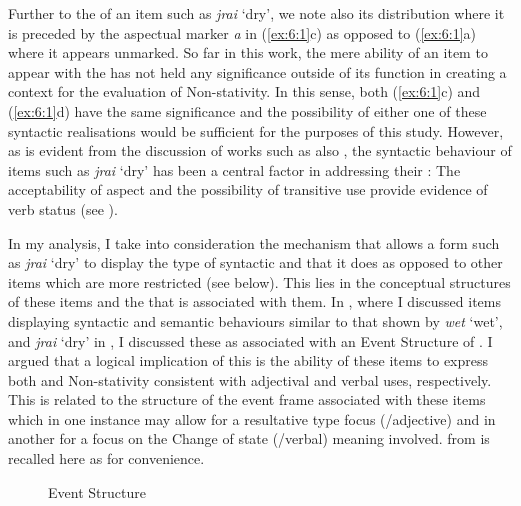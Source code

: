 Further to the  of an item such as \textit{jrai} `dry', we note also its distribution where it is preceded by the aspectual marker \textit{a} in (\ref{ex:6:1}c) as opposed to (\ref{ex:6:1}a) where it appears unmarked. So far in this work, the mere ability of an item to appear with the   has not held any significance outside of its function in creating a context for the evaluation of Non-stativity. In this sense, both (\ref{ex:6:1}c) and (\ref{ex:6:1}d) have the same significance and the possibility of either one of these syntactic realisations would be sufficient for the purposes of this study. However, as is evident from the discussion of works such as \citet{Winford1993,Sebba1986,Seuren1986} also \citet{Kouwenberg1996}, the syntactic behaviour of items such as \textit{jrai}  `dry’ has been a central factor in addressing their : The acceptability of  aspect and the possibility of transitive use provide evidence of verb status (see ). 

In my analysis, I take into consideration the mechanism that allows a form such as \textit{jrai} `dry' to display the type of syntactic and  that it does as opposed to other items which are more restricted (see  below). This lies in the conceptual structures of these items and the  that is associated with them. In , where I discussed items displaying syntactic and semantic behaviours similar to that shown by \textit{wet} `wet', and \textit{jrai} `dry' in , I discussed these as associated with an Event Structure of . I argued that a logical implication of this is the ability of these items to express both  and Non-stativity consistent with adjectival and verbal uses, respectively. This is related to the structure of the event frame associated with these items which in one instance may allow for a resultative type focus (\slash adjective) and in another for a focus on the Change of state (\slash verbal) meaning involved.  from  is recalled here as  for convenience.

\begin{figure}
\caption{ Event Structure \citep[56]{Pustejovsky1991}\label{ex:6:2}}
\end{figure}


